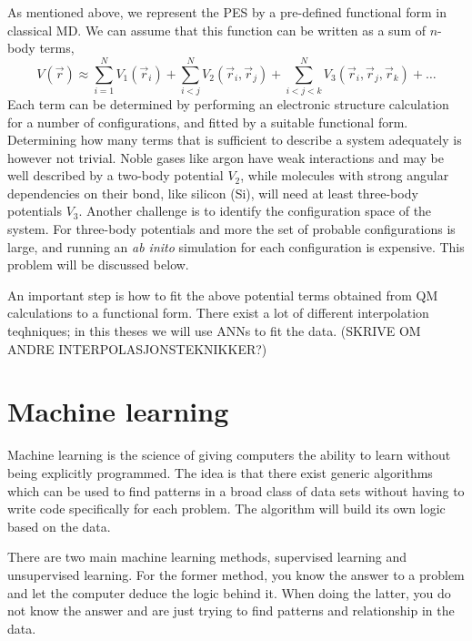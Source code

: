 \documentclass[twoside,english]{uiofysmaster}
\begin{document}
As mentioned above, we represent the PES by a pre-defined functional form in classical MD. We can assume that this
function can be written as a sum of $n$-body terms,
\begin{equation}
 V(\vec{r}) \approx \sum_{i=1}^N V_1(\vec{r}_i) + \sum_{i<j}^N V_2(\vec{r}_i, \vec{r}_j) + 
 \sum_{i<j<k}^N V_3(\vec{r}_i, \vec{r}_j, \vec{r}_k) + \dots
\end{equation}
Each term can be determined by performing an electronic structure calculation for a number of configurations, 
and fitted by a suitable functional form. Determining how many terms that is sufficient to 
describe a system adequately is however not trivial. Noble gases like argon have weak interactions and 
may be well described by a two-body potential $V_2$, while molecules with strong angular dependencies on their bond, like
silicon (Si), will need at least three-body potentials $V_3$. Another challenge is to identify the
configuration space of the system. For three-body potentials and more the set of probable configurations is large, and 
running an \textit{ab inito} simulation for each configuration is expensive. This problem will be discussed below. 

An important step is how to fit the above potential terms obtained from QM calculations to a functional form. 
There exist a lot of different interpolation teqhniques; in this theses we will use ANNs to fit the data. 
(SKRIVE OM ANDRE INTERPOLASJONSTEKNIKKER?)




\chapter{Machine learning}
Machine learning is the science of giving computers the ability to learn without being explicitly programmed. 
The idea is that there exist generic algorithms which can be used to find patterns in a broad class of data sets without 
having to write code specifically for each problem. The algorithm will build its own logic based on the data. 

There are two main machine learning methods, supervised learning and unsupervised learning. For the former method, 
you know the answer to a problem and let the computer deduce the logic behind it. When doing the latter, you do not
know the answer and are just trying to find patterns and relationship in the data. 
\end{document}
